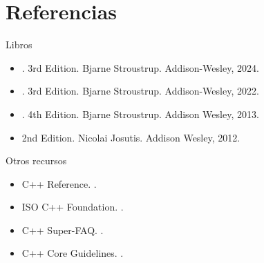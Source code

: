 \section{Referencias}

\begin{frame}[t]{Libros}
\begin{itemize}
  \item {}.
        3rd Edition.
        Bjarne Stroustrup.
        Addison-Wesley, 2024.

  \vfill
  \item {}.
        3rd Edition.
        Bjarne Stroustrup.
        Addison-Wesley, 2022.

  \vfill
  \item {}.
        4th Edition.
        Bjarne Stroustrup.
        Addison Wesley, 2013.

  \vfill
  \item {}
        2nd Edition.
        Nicolai Josutis.
        Addison Wesley, 2012.
\end{itemize}
\end{frame}

\begin{frame}[t]{Otros recursos}
\begin{itemize}
  \item C++ Reference.
        .

  \vfill
  \item ISO C++ Foundation.
        .

  \vfill
  \item C++ Super-FAQ.
        .

  \vfill
  \item C++ Core Guidelines.
        .
\end{itemize}
\end{frame}
